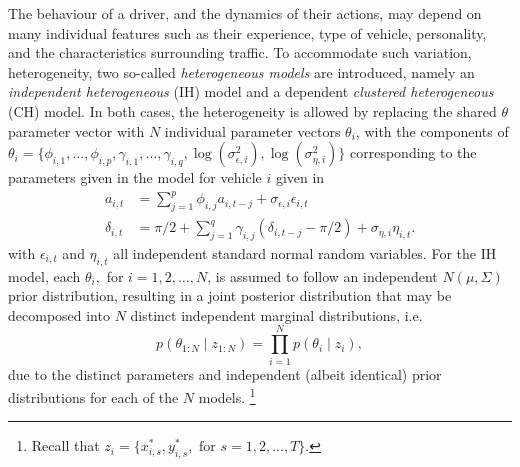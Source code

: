 \documentclass[
12pt, %
onehalfspacing, %
nohyperref, %
headsepline, %
chapterinoneline, %
]{MastersDoctoralThesis} %
\begin{document}
The behaviour of a driver, and the dynamics of their actions, may depend on many individual features such as their experience, type of vehicle, personality, and the characteristics surrounding traffic. To accommodate such variation, heterogeneity, two so-called \textit{heterogeneous models} are introduced, namely an \textit{independent heterogeneous} (IH) model and a dependent \textit{clustered heterogeneous} (CH) model. In both cases, the heterogeneity is allowed by replacing the shared $\theta$ parameter vector with $N$ individual parameter vectors $\theta_i$, with the components of $\theta_i=\{\phi_{i,1}, \ldots, \phi_{i,p}, \gamma_{i,1}, \ldots, \gamma_{i,q}, \log(\sigma^{2}_{\epsilon,i}), \log(\sigma^{2}_{\eta,i})\}$ corresponding to the parameters given in the model for vehicle $i$ given in
\begin{align}
a_{i, t} &= \sum_{j = 1}^p \phi_{i, j} a_{i, t-j} + \sigma_{\epsilon, i} \epsilon_{i, t} \label{cars:aAR2} \\
\delta_{i, t} &= \pi/2 + \sum_{j = 1}^q \gamma_{i, j} (\delta_{i, t-j} - \pi/2) + \sigma_{\eta, i} \eta_{i, t}. \label{cars:dAR2}
\end{align}
with $\epsilon_{i,t}$ and $\eta_{i,t}$ all independent standard normal random variables. For the IH model, each $\theta_i,$ for $i=1,2,\ldots, N$, is assumed to follow an independent $N(\mu, \Sigma)$ prior distribution, resulting in a joint posterior distribution that may be decomposed into $N$ distinct independent marginal distributions, i.e.
\begin{equation}
p(\theta_{1:N} \mid z_{1:N}) = \prod_{i=1}^N p(\theta_{i} \mid z_{i}),
\end{equation}
due to the distinct parameters and independent (albeit identical) prior distributions for each of the $N$ models. \footnote{Recall that $z_{i}=\{x^*_{i,s},y^*_{i,s},\mbox{ for } s=1,2,...,T \}$.}
\\
\end{document}
